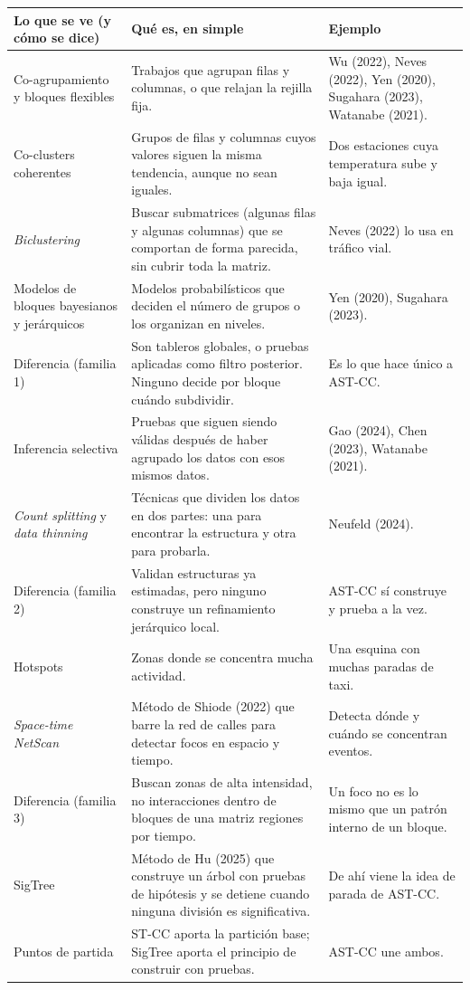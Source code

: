 \documentclass[11pt,a4paper]{article}
\makeatletter
\newenvironment{partes}{%
  \begin{longtable}{@{}>{\raggedright\arraybackslash}p{4.3cm}>{\raggedright\arraybackslash}p{6.0cm}>{\raggedright\arraybackslash}p{5.0cm}@{}}
  \toprule \textbf{Lo que se ve (y cómo se dice)} & \textbf{Qué es, en simple} & \textbf{Ejemplo}\\ \midrule \endhead}{%
  \bottomrule\end{longtable}}
\newcommand{\se}[1]{\newline{\small\color{ucspblue}(se dice «#1»)}}
\makeatother
\begin{document}
\begin{partes}
Co-agrupamiento y bloques flexibles & Trabajos que agrupan filas y columnas, o que relajan la rejilla fija. & Wu (2022), Neves (2022), Yen (2020), Sugahara (2023), Watanabe (2021). \\
Co-clusters coherentes \se{co-clusters} & Grupos de filas y columnas cuyos valores siguen la misma tendencia, aunque no sean iguales. & Dos estaciones cuya temperatura sube y baja igual. \\
\emph{Biclustering} \se{báiclasterin} & Buscar submatrices (algunas filas y algunas columnas) que se comportan de forma parecida, sin cubrir toda la matriz. & Neves (2022) lo usa en tráfico vial. \\
Modelos de bloques bayesianos y jerárquicos & Modelos probabilísticos que deciden el número de grupos o los organizan en niveles. & Yen (2020), Sugahara (2023). \\
Diferencia (familia 1) & Son tableros globales, o pruebas aplicadas como filtro posterior. Ninguno decide por bloque cuándo subdividir. & Es lo que hace único a AST-CC. \\
Inferencia selectiva & Pruebas que siguen siendo válidas después de haber agrupado los datos con esos mismos datos. & Gao (2024), Chen (2023), Watanabe (2021). \\
\emph{Count splitting} \se{caunt splíting} y \emph{data thinning} \se{deita zínin} & Técnicas que dividen los datos en dos partes: una para encontrar la estructura y otra para probarla. & Neufeld (2024). \\
Diferencia (familia 2) & Validan estructuras ya estimadas, pero ninguno construye un refinamiento jerárquico local. & AST-CC sí construye y prueba a la vez. \\
Hotspots \se{jótspots} & Zonas donde se concentra mucha actividad. & Una esquina con muchas paradas de taxi. \\
\emph{Space-time NetScan} \se{espéis-táim nétscan} & Método de Shiode (2022) que barre la red de calles para detectar focos en espacio y tiempo. & Detecta dónde y cuándo se concentran eventos. \\
Diferencia (familia 3) & Buscan zonas de alta intensidad, no interacciones dentro de bloques de una matriz regiones por tiempo. & Un foco no es lo mismo que un patrón interno de un bloque. \\
SigTree \se{sig-trí} & Método de Hu (2025) que construye un árbol con pruebas de hipótesis y se detiene cuando ninguna división es significativa. & De ahí viene la idea de parada de AST-CC. \\
Puntos de partida & ST-CC aporta la partición base; SigTree aporta el principio de construir con pruebas. & AST-CC une ambos. \\
\end{partes}
\end{document}
